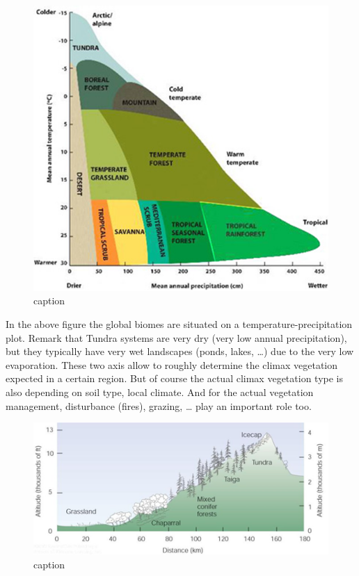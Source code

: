 \documentclass[12pt,oneside]{book}
\begin{document}
\begin{figure}

{\centering \includegraphics[width=0.8\linewidth]{figures/Figure88} 

}

\caption{caption}\label{fig:Vegetationzones3}
\end{figure}

In the above figure the global biomes are situated on a
temperature-precipitation plot. Remark that Tundra systems are very dry
(very low annual precipitation), but they typically have very wet
landscapes (ponds, lakes, \ldots{}) due to the very low evaporation.
These two axis allow to roughly determine the climax vegetation expected
in a certain region. But of course the actual climax vegetation type is
also depending on soil type, local climate. And for the actual
vegetation management, disturbance (fires), grazing, \ldots{} play an
important role too.

\begin{figure}

{\centering \includegraphics[width=0.8\linewidth]{figures/Figure89} 

}

\caption{caption}\label{fig:Vegetationzones4}
\end{figure}
\end{document}
